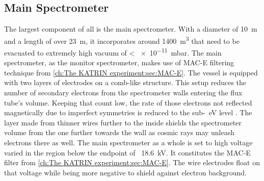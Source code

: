       \subsection{Main Spectrometer}
      \label{ch:The KATRIN experiment:sec:Experimental setup:subsec:MainSpec}
      The largest component of all is the main spectrometer. With a diameter of \SI{10}{\meter} and a length of over \SI{23}{\meter}, it incorporates around \SI{1400}{\cubic\meter} that need to be evacuated to extremely high vacuum of < \SI{e-11}{\milli\bar}. The main spectrometer, as the monitor spectrometer, makes use of MAC-E filtering technique from \ref{ch:The KATRIN experiment:sec:MAC-E}. The vessel is equipped with two layers of electrodes on a comb-like structure. This setup reduces the number of secondary electrons from the spectrometer walls entering the flux tube's volume. Keeping that count low, the rate of those electrons not reflected magnetically due to imperfect symmetries is reduced to the sub-\SI{}{\electronvolt} level \cite{wireElectrodeSystem}. The layer made from thinner wires further to the inside shields the spectrometer volume from the one further towards the wall as cosmic rays may unleash electrons there as well.
      The main spectrometer as a whole is set to high voltage varied in the region below the endpoint of ~\SI{18.6}{\kilo\volt}. It constitutes the MAC-E filter from \ref{ch:The KATRIN experiment:sec:MAC-E}. The wire electrodes float on that voltage while being more negative to shield against electron background.
